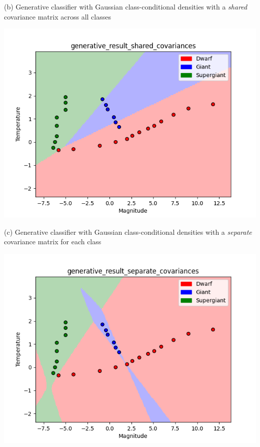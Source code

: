 \documentclass[submit]{harvardml}
\begin{document}
(b) Generative classifier with Gaussian class-conditional densities with a \textit{shared} covariance matrix across all classes
\begin{center}
    \includegraphics[scale=0.7]{generative_result_shared_covariances.png}
\end{center}

(c) Generative classifier with Gaussian class-conditional densities with a \textit{separate} covariance matrix for each class
\begin{center}
    \includegraphics[scale=0.7]{generative_result_separate_covariances.png}
\end{center}
\end{document}
